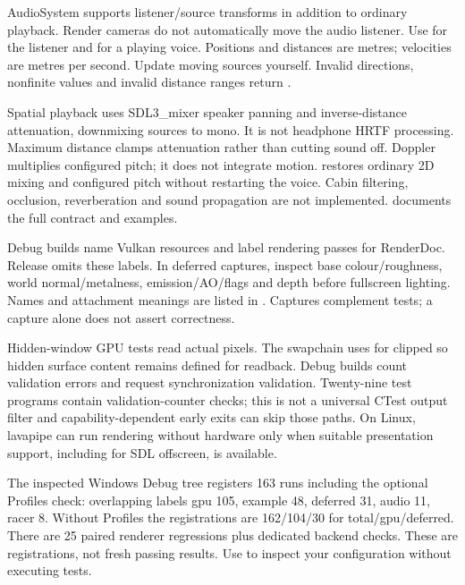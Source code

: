 \documentclass[11pt,a4paper]{article}
\begin{document}
AudioSystem supports listener/source transforms in addition to ordinary playback. Render cameras do not automatically move the audio listener. Use  for the listener and  for a playing voice. Positions and distances are metres; velocities are metres per second. Update moving sources yourself. Invalid directions, nonfinite values and invalid distance ranges return .

Spatial playback uses SDL3\_mixer speaker panning and inverse-distance attenuation, downmixing sources to mono. It is not headphone HRTF processing. Maximum distance clamps attenuation rather than cutting sound off. Doppler multiplies configured pitch; it does not integrate motion.  restores ordinary 2D mixing and configured pitch without restarting the voice. Cabin filtering, occlusion, reverberation and sound propagation are not implemented.  documents the full contract and examples.

Debug builds name Vulkan resources and label rendering passes for RenderDoc. Release omits these labels. In deferred captures, inspect base colour/roughness, world normal/metalness, emission/AO/flags and depth before fullscreen lighting. Names and attachment meanings are listed in . Captures complement tests; a capture alone does not assert correctness.

Hidden-window GPU tests read actual pixels. The swapchain uses  for clipped so hidden surface content remains defined for readback. Debug builds count validation errors and request synchronization validation. Twenty-nine test programs contain validation-counter checks; this is not a universal CTest output filter and capability-dependent early exits can skip those paths. On Linux, lavapipe can run rendering without hardware only when suitable presentation support, including  for SDL offscreen, is available.

The inspected Windows Debug tree registers 163 runs including the optional Profiles check: overlapping labels gpu 105, example 48, deferred 31, audio 11, racer 8. Without Profiles the registrations are 162/104/30 for total/gpu/deferred. There are 25 paired renderer regressions plus dedicated backend checks. These are registrations, not fresh passing results. Use  to inspect your configuration without executing tests.
\end{document}
